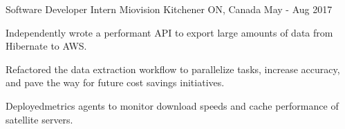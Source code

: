 \begin{cventries}
\cventry
    {Software Developer Intern}
    {Miovision}
    {Kitchener ON, Canada}
    {May - Aug 2017}
    {
      \begin{cvitems}
        \item Independently wrote a performant API to export large amounts of data from Hibernate to AWS.
        \item Refactored the data extraction workflow to parallelize tasks, increase accuracy, and pave the way
        for future cost savings initiatives.
        \item Deployedmetrics agents to monitor download speeds and cache performance of satellite servers.
      \end{cvitems}
    }

\end{cventries}
